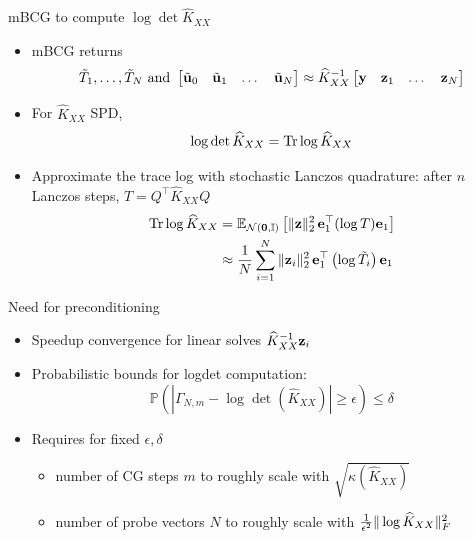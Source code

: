 \documentclass{beamer}
\begin{document}
\begin{frame}{mBCG to compute {\normalsize $\log\det \widehat K_{XX}$}}
\begin{itemize}[<+->]
    \item mBCG returns
    \begin{equation*}
        \tilde T_1, \ldots, \tilde T_N \text{ and } \begin{bmatrix} \tilde{\boldsymbol{\mathbf{u}}}_0 & \tilde{\boldsymbol{\mathbf{u}}}_1 & \dots & \tilde{\boldsymbol{\mathbf{u}}}_N \end{bmatrix} \approx 
    \widehat K_{XX}^{-1} \begin{bmatrix} \boldsymbol{\mathbf{y}} & \boldsymbol{\mathbf{z}}_1 & \dots & \boldsymbol{\mathbf{z}}_N \end{bmatrix}
    \end{equation*}
    \item For $\widehat K_{XX}$ SPD,
    \begin{equation*}
        \log\det \widehat K_{XX} = \operatorname{Tr} \log \widehat K_{XX}
    \end{equation*}
    \item Approximate the trace log with stochastic Lanczos quadrature: after $n$ Lanczos steps, $T = Q^\top \widehat K_{XX} Q$
    \begin{align*}
        \trace \log \widehat K_{XX} &= \E_{\mathcal N(\vect 0, \Id)} \left[ \norm{\vect z}_2^2 \, \vect e_1^\top (\log T) \vect e_1 \right]\\
        &\approx \frac{1}{N} \sum_{i=1}^N \norm{\vect z_i}_2^2 \, \vect e_1^\top \left(\log  \tilde T_i \right) \vect e_1
    \end{align*}
\end{itemize}
\end{frame}

\begin{frame}{Need for preconditioning}
\begin{itemize}[<+->]
    \item Speedup convergence for linear solves $\widehat K_{XX}^{-1} \boldsymbol{\mathbf{z}}_i$
    \item Probabilistic bounds for logdet computation:
    \begin{equation*}
        \mathbb P\left( |\Gamma_{N, m} - \log\det(\widehat K_{XX})| \ge \epsilon  \right) \le \delta
    \end{equation*}
    \item Requires for fixed $\epsilon, \delta$ \begin{itemize}
        \item number of CG steps $m$ to roughly scale with $\sqrt{\kappa(\widehat K_{XX})}$
        \item number of probe vectors $N$ to roughly scale with $\frac{1}{\epsilon^2} \Vert \log \widehat K_{XX} \Vert_F^2$
    \end{itemize}
\end{itemize}
\end{frame}
\end{document}
